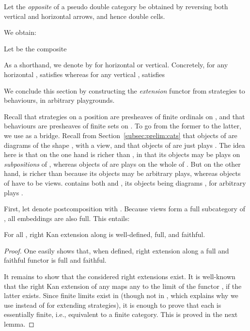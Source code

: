 \documentclass{LMCS}
\theoremstyle{plain}\newtheorem{satz}[thm]{Satz}
\begin{document}
   \begin{defi}
     Let the \emph{opposite}  of a pseudo double category
      be obtained by reversing both vertical and horizontal
     arrows, and hence double cells.
   \end{defi}


   We obtain:
   \begin{defi}\label{def:SSfunctor}
     Let  be the composite
     
   \end{defi}
   As a shorthand, we denote  by  for 
   horizontal or vertical.  Concretely, for any horizontal ,  satisfies  whereas for any vertical ,  satisfies
   




We conclude this section by constructing the \emph{extension}
functor from strategies to behaviours, in arbitrary playgrounds.

Recall that strategies on a position  are presheaves of finite
ordinals on , and that behaviours are presheaves of finite
sets on .  To go from the former to the latter, we use 
as a bridge.  Recall from Section~\ref{subsec:prelim:cats} that
objects of  are diagrams of the shape , with  a view, and that objects of  are just plays . The idea here is that on the one hand  is richer
than , in that its objects may be plays on \emph{subpositions}
of , whereas objects of  are plays on the whole of .  But
on the other hand,  is richer than  because its objects
may be arbitrary plays, whereas objects of  have to be
views.  contains both  and , its objects
being diagrams , for arbitrary plays .

First, let  denote
postcomposition with .  Because views form a full
subcategory of , all embeddings 
are also full.  This entails:
\begin{lem}\label{lem:kanff}
  For all , right Kan extension  along  is well-defined, full, and faithful.
\end{lem}

\begin{proof}
  One easily shows that, when defined, right extension along a full
  and faithful functor is full and faithful. 

  It remains to show that the considered right extensions exist.  It
  is well-known~\citep{MacLane:cwm} that the right Kan extension of
  any  maps any  to the limit of the
  functor , if
  the latter exists.  Since finite limits exist in  (though not
  in , which explains why we use  instead of  for
  extending strategies), it is enough to prove that each  is essentially finite, i.e., equivalent to a finite
  category. This is proved in the next lemma.
\end{proof}
\end{document}
